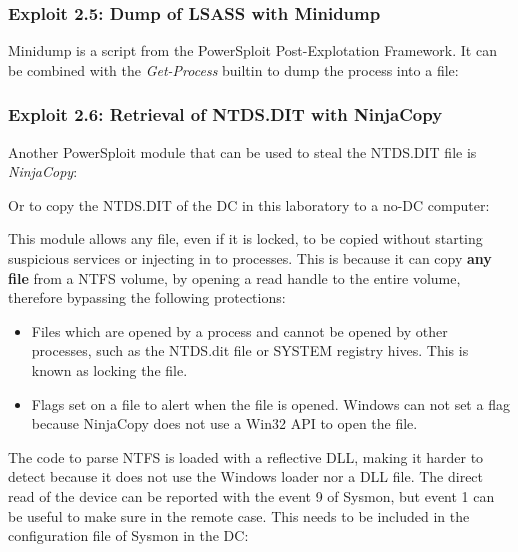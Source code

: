 \subsubsection{Exploit 2.5: Dump of LSASS with Minidump}
Minidump is a script from the PowerSploit Post-Explotation Framework\cite{powersploit}. It can be combined with the \textit{Get-Process} builtin to dump the process into a file:


\subsubsection{Exploit 2.6: Retrieval of NTDS.DIT with NinjaCopy} \label{invoke-NinjaCopy}
Another PowerSploit module that can be used to steal the NTDS.DIT file is \textit{NinjaCopy}:

\linej
Or to copy the NTDS.DIT of the DC in this laboratory to a no-DC computer:

\linej
This module allows any file, even if it is locked, to be copied without starting suspicious services or injecting in to processes. This is because it can copy \textbf{any file} from a NTFS volume, by opening a read handle to the entire volume, therefore bypassing the following protections\cite{dump_ways}:
\begin{itemize}
	\item Files which are opened by a process and cannot be opened by other processes, such as the NTDS.dit file or SYSTEM registry hives. This is known as locking the file.
	\item Flags set on a file to alert when the file is opened. Windows can not set a flag because NinjaCopy does not use a Win32 API to open the file.
\end{itemize}
\linej
The code to parse NTFS is loaded with a reflective DLL, making it harder to detect because it does not use the Windows loader nor a DLL file.
\linej
The direct read of the device can be reported with the event 9 of Sysmon, but event 1 can be useful to make sure in the remote case. This needs to be included in the configuration file of Sysmon in the DC:

\linej

